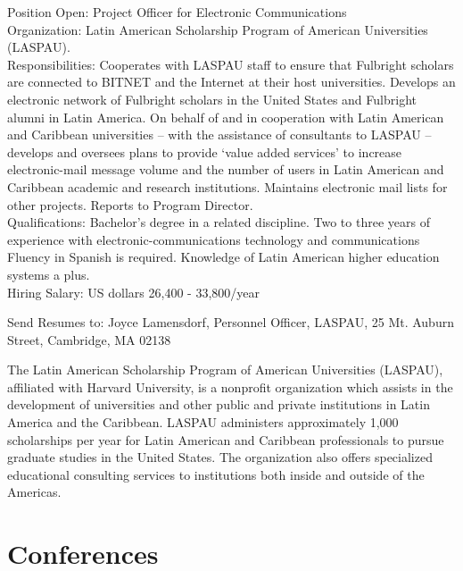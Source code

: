 Position Open:  Project Officer for Electronic Communications\\
Organization:  Latin American Scholarship Program of American Universities 
(LASPAU).\\
Responsibilities:  Cooperates with LASPAU staff to ensure that Fulbright 
scholars are connected to BITNET and the Internet at their host 
universities.  Develops an electronic network of Fulbright scholars in the 
United States and Fulbright alumni in Latin America.  On behalf of and in 
cooperation with Latin American and Caribbean universities -- with the 
assistance of consultants to LASPAU -- develops and oversees plans to 
provide `value added services' to increase  electronic-mail message volume 
and the number of users in Latin American and Caribbean academic and 
research institutions.  Maintains electronic mail lists for other projects. 
Reports to Program Director.   \\
Qualifications:  Bachelor's degree in a related discipline.  Two to three 
years of experience with electronic-communications technology and 
communications Fluency in Spanish is required.  Knowledge of Latin American 
higher education systems a plus.\\
Hiring Salary: US dollars 26,400 - 33,800/year

Send Resumes to:
Joyce Lamensdorf, Personnel Officer,
LASPAU,
25 Mt. Auburn Street,
Cambridge, MA  02138

The Latin American Scholarship Program of American Universities (LASPAU), 
affiliated with Harvard University, is a nonprofit organization which 
assists in the development of universities and other public and private 
institutions in Latin America and the Caribbean.  LASPAU administers 
approximately 1,000 scholarships per year for Latin American and Caribbean 
professionals to pursue graduate studies in the United States.  The 
organization also offers specialized educational consulting services to 
institutions both inside and outside of the Americas.

\section{Conferences}
